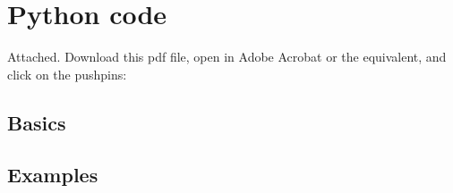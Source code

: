 \documentclass[11pt]{article}
\begin{document}
\section*{Python code}

Attached.  Download this pdf file, open in Adobe Acrobat or the equivalent,
and click on the pushpins:

\subsection*{Basics}
{\small

}

\subsection*{Examples}

{\small

}
\end{document}
